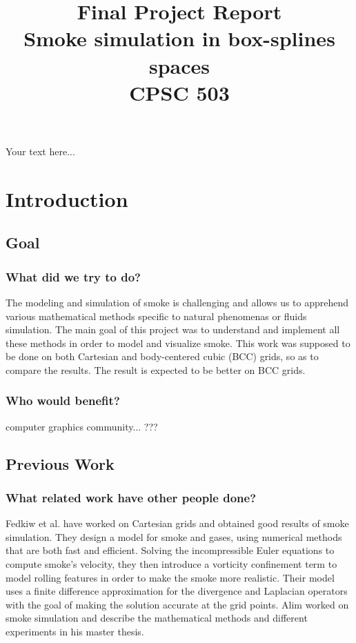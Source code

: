 \documentclass[accepted,single]{gipaper}
\title{Final Project Report \\
Smoke simulation in box-splines spaces\\
CPSC 503}
\affiliation{Department of Computer Science \\University of Calgary
\\\tt{ealtazin@cpsc.ucalgary.ca}}
\begin{document}
\begin{keywords}
Your text here...
\end{keywords}


\section{Introduction}

\subsection{Goal}

\subsubsection{What did we try to do?}

The modeling and simulation of smoke is challenging and allows us to apprehend various mathematical methods specific to natural phenomenas or fluids simulation. The main goal of this project was to understand and implement all these methods in order to model and visualize smoke. This work was supposed to be done on both Cartesian and body-centered cubic (BCC) grids, so as to compare the results. The result is expected to be better on BCC grids.

\subsubsection{Who would benefit?}

computer graphics community... ???

\subsection{Previous Work}

\subsubsection{What related work have other people done?}
Fedkiw et al. \cite{Fedkiw:2001} have worked on Cartesian grids and obtained good results of smoke simulation. They design a model for smoke and gases, using numerical methods that are both fast and efficient. Solving the incompressible Euler equations to compute smoke's velocity, they then introduce a vorticity confinement term to model rolling features in order to make the smoke more realistic. Their model uses a finite difference approximation for the divergence and Laplacian operators with the goal of making the solution accurate at the grid points.
Alim \cite{alim:ms} worked on smoke simulation and describe the mathematical methods and different experiments in his master thesis.
\end{document}
